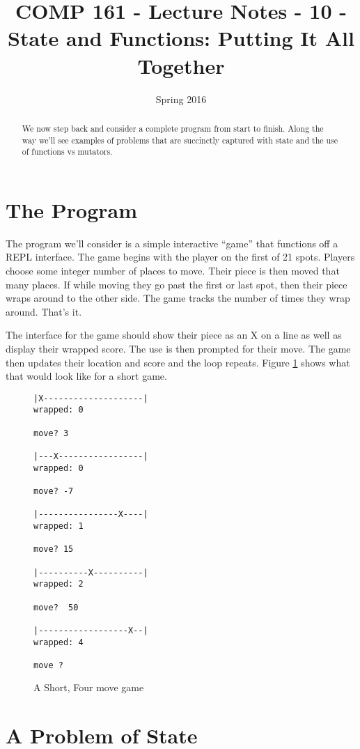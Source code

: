 \documentclass[nobib]{tufte-handout}
\title{COMP 161 - Lecture Notes - 10 - State and Functions: Putting It All Together}
\date{Spring 2016}
\begin{document}
 
\maketitle

\begin{abstract}
We now step back and consider a complete program from start to finish. Along the way we'll see examples of problems that are succinctly captured with state and the use of functions vs mutators. 
\end{abstract}

\section{The Program}

The program we'll consider is a simple interactive ``game'' that functions off a REPL interface. The game begins with the player on the first of 21 spots. Players choose some integer number of places to move. Their piece is then moved that many places. If while moving they go past the first or last spot, then their piece wraps around to the other side. The game tracks the number of times they wrap around. That's it. 

The interface for the game should show their piece as an X on a line as well as display their wrapped score. The use is then prompted for their move. The game then updates their location and score and the loop repeats. Figure \ref{fig:example} shows what that would look like for a short game. 

\begin{figure}[!htbp]
\begin{verbatim}
|X--------------------|
wrapped: 0 

move? 3

|---X-----------------|
wrapped: 0 

move? -7

|----------------X----|
wrapped: 1 

move? 15

|----------X----------|
wrapped: 2 

move?  50

|------------------X--|
wrapped: 4 

move ?
\end{verbatim}
\label{fig:example}
\caption{A Short, Four move game}
\end{figure}

\section{A Problem of State}
\end{document}
